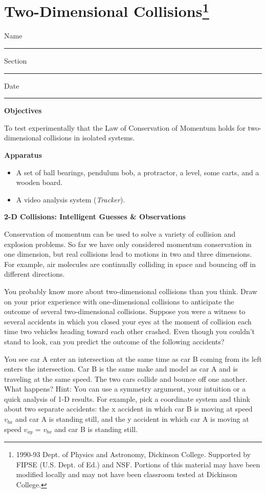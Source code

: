 
\section{Two-Dimensional Collisions\footnote{
1990-93 Dept. of Physics and Astronomy, Dickinson College. Supported by FIPSE
(U.S. Dept. of Ed.) and NSF. Portions of this material may have been modified
locally and may not have been classroom tested at Dickinson College.
}}

Name \rule{2.0in}{0.1pt}\hfill{}Section \rule{1.0in}{0.1pt}\hfill{}Date \rule{1.0in}{0.1pt}

\textbf{Objectives} 

To test experimentally that the Law of Conservation of Momentum holds for two-dimensional
collisions in isolated systems.

\textbf{Apparatus}

\begin{itemize}
\item A set of ball bearings, pendulum bob, a protractor, a level, some carts, 
and a wooden board.
\item A video analysis system (\textit{Tracker}).
\end{itemize}
\textbf{2-D Collisions: Intelligent Guesses \& Observations }

Conservation of momentum can be used to solve a variety of collision and explosion
problems. So far we have only considered momentum conservation in one dimension,
but real collisions lead to motions in two and three dimensions. For example,
air molecules are continually colliding in space and bouncing off in different
directions. 

You probably know more about two-dimensional collisions than you think. Draw
on your prior experience with one-dimensional collisions to anticipate the outcome
of several two-dimensional collisions. Suppose you were a witness to several
accidents in which you closed your eyes at the moment of collision each time
two vehicles heading toward each other crashed. Even though you couldn't stand
to look, can you predict the outcome of the following accidents?

You see car A enter an intersection at the same time as car B coming from its
left enters the intersection. Car B is the same make and model as car A and
is traveling at the same speed. The two cars collide and bounce off one another.
What happens? Hint: You can use a symmetry argument, your intuition or a quick
analysis of 1-D results. For example, pick a coordinate system and think about
two separate accidents: the x accident in which car B is moving at speed \( v_{bx} \)
and car A is standing still, and the y accident in which car A is moving at
speed \( v_{ay} \) = \( v_{bx} \) and car B is standing still. 

